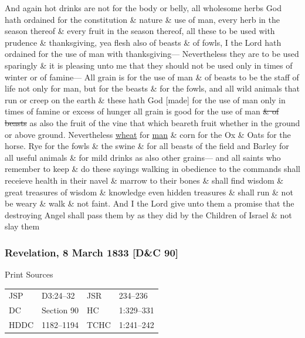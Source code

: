 				And again hot drinks are not for the body or belly, all wholesome herbs God hath ordained for the constitution \& nature \& use of man, every herb in the season thereof \& every fruit in the season thereof, all these to be used with prudence \& thanksgiving, yea flesh also of beasts \& of fowls, I the Lord hath ordained for the use of man with thanksgiving--- Nevertheless they are to be used sparingly \& it is pleasing unto me that they should not be used only in times of winter or of famine--- All grain is for the use of man \& of beasts to be the staff of life not only for man, but for the beasts \& for the fowls, and all wild animals that run or creep on the earth \& these hath God [made] for the use of man only in times of famine or excess of hunger all grain is good for the use of man \sout{\& of beasts} as also the fruit of the vine that which beareth fruit whether in the ground or above ground. Nevertheless \uline{wheat} for \uline{man} \& corn for the Ox \& Oats for the horse. Rye for the fowls \& the swine \& for all beasts of the field and Barley for all useful animals \& for mild drinks as also other grains--- and all saints who remember to keep \& do these sayings walking in obedience to the commands shall receieve health in their navel \& marrow to their bones \& shall find wisdom \& great treasures of wisdom \& knowledge even hidden treasures \& shall run \& not be weary \& walk \& not faint. And I the Lord give unto them a promise that the destroying Angel shall pass them by as they did by the Children of Israel \& not slay them
				
		\subsubsection{Revelation, 8 March 1833 [D\&C 90]}
			\label{EMS-1833-JS-8-MAR-1833}
		
			\begin{description}
				\item[Print Sources]
			\end{description}

				\begin{tabular}{p{0.5in}p{1in}p{0.5in}p{1in}}
				JSP	 	& D3:24--32			& JSR 		& 234--236 \\
				DC	 	& Section 90 		& HC 		& 1:329--331 \\
				HDDC 	& 1182--1194		& TCHC 		& 1:241--242 \\
				\end{tabular}
			
